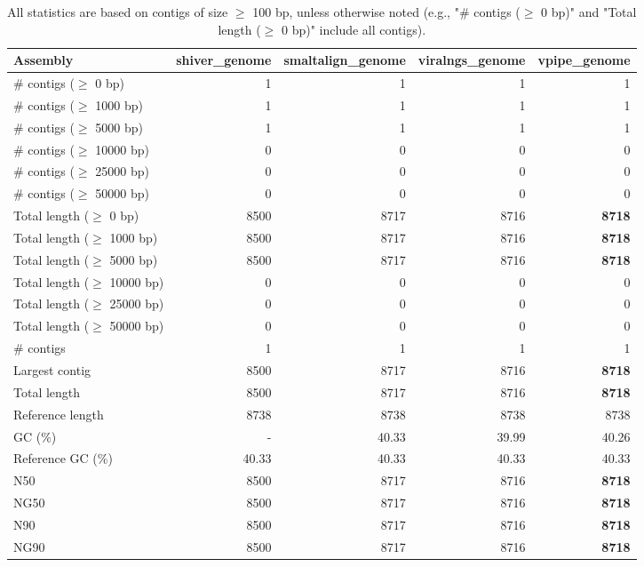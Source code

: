 \documentclass[12pt,a4paper]{article}
\begin{document}
\begin{table}[ht]
\begin{center}
\caption{All statistics are based on contigs of size $\geq$ 100 bp, unless otherwise noted (e.g., "\# contigs ($\geq$ 0 bp)" and "Total length ($\geq$ 0 bp)" include all contigs).}
\begin{tabular}{|l*{4}{|r}|}
\hline
Assembly & shiver\_genome & smaltalign\_genome & viralngs\_genome & vpipe\_genome \\ \hline
\# contigs ($\geq$ 0 bp) & 1 & 1 & 1 & 1 \\ \hline
\# contigs ($\geq$ 1000 bp) & 1 & 1 & 1 & 1 \\ \hline
\# contigs ($\geq$ 5000 bp) & 1 & 1 & 1 & 1 \\ \hline
\# contigs ($\geq$ 10000 bp) & 0 & 0 & 0 & 0 \\ \hline
\# contigs ($\geq$ 25000 bp) & 0 & 0 & 0 & 0 \\ \hline
\# contigs ($\geq$ 50000 bp) & 0 & 0 & 0 & 0 \\ \hline
Total length ($\geq$ 0 bp) & 8500 & 8717 & 8716 & {\bf 8718} \\ \hline
Total length ($\geq$ 1000 bp) & 8500 & 8717 & 8716 & {\bf 8718} \\ \hline
Total length ($\geq$ 5000 bp) & 8500 & 8717 & 8716 & {\bf 8718} \\ \hline
Total length ($\geq$ 10000 bp) & 0 & 0 & 0 & 0 \\ \hline
Total length ($\geq$ 25000 bp) & 0 & 0 & 0 & 0 \\ \hline
Total length ($\geq$ 50000 bp) & 0 & 0 & 0 & 0 \\ \hline
\# contigs & 1 & 1 & 1 & 1 \\ \hline
Largest contig & 8500 & 8717 & 8716 & {\bf 8718} \\ \hline
Total length & 8500 & 8717 & 8716 & {\bf 8718} \\ \hline
Reference length & 8738 & 8738 & 8738 & 8738 \\ \hline
GC (\%) & - & 40.33 & 39.99 & 40.26 \\ \hline
Reference GC (\%) & 40.33 & 40.33 & 40.33 & 40.33 \\ \hline
N50 & 8500 & 8717 & 8716 & {\bf 8718} \\ \hline
NG50 & 8500 & 8717 & 8716 & {\bf 8718} \\ \hline
N90 & 8500 & 8717 & 8716 & {\bf 8718} \\ \hline
NG90 & 8500 & 8717 & 8716 & {\bf 8718} \\ \hline

\end{tabular}
\end{center}
\end{table}
\end{document}
